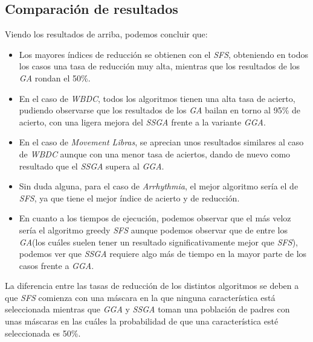 \documentclass[a4paper, 11pt]{article}
\begin{document}
		\subsection{Comparación de resultados}
			
			
			Viendo los resultados de arriba, podemos concluir que:
			\begin{itemize}
				\item Los mayores índices de reducción se obtienen con el \textit{SFS}, obteniendo en
				todos los casos una tasa de reducción muy alta, mientras que los resultados de los
				\textit{GA} rondan el 50\%.
				
				\item En el caso de \textit{WBDC}, todos los algoritmos tienen una alta tasa de acierto,
				pudiendo observarse que los resultados de los \textit{GA} bailan en torno al 95\% de
				acierto, con una ligera mejora del \textit{SSGA} frente a la variante \textit{GGA}.
				
				\item En el caso de \textit{Movement Libras}, se aprecian unos resultados similares
				al caso de \textit{WBDC} aunque con una menor tasa de aciertos, dando de nuevo como
				resultado que el \textit{SSGA} supera al \textit{GGA}.
				
				\item Sin duda alguna, para el caso de \textit{Arrhythmia}, el mejor algoritmo sería
				el de \textit{SFS}, ya que tiene el mejor índice de acierto y de reducción.
				
				\item En cuanto a los tiempos de ejecución, podemos observar que el más veloz sería el
				algoritmo greedy \textit{SFS} aunque podemos observar que de entre los \textit{GA}(los
				cuáles suelen tener un resultado significativamente mejor que \textit{SFS}), podemos
				ver que \textit{SSGA} requiere algo más de tiempo en la mayor parte de los casos
				frente a \textit{GGA}.
			\end{itemize}
			
			La diferencia entre las tasas de reducción de los distintos algoritmos se deben a que \textit{SFS}
			comienza con una máscara en la que ninguna característica está seleccionada mientras que
			\textit{GGA} y \textit{SSGA} toman una población de padres con unas máscaras en las cuáles
			la probabilidad de que una característica esté seleccionada es 50\%.
			
\end{document}
